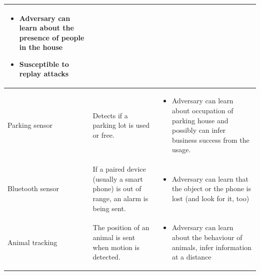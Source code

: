 \begin{longtable}[c]{|l|l|l|}
\begin{minipage}[t]{0.40\columnwidth}
\begin{itemize}
\item
  {Adversary can learn about the presence of people in the house}
\item
  {Susceptible to replay attacks}
\end{itemize}
\strut\end{minipage}\tabularnewline
\hline
\begin{minipage}[t]{0.20\columnwidth}\raggedright\strut
{Parking sensor}
\strut\end{minipage} &
\begin{minipage}[t]{0.30\columnwidth}\raggedright\strut
{Detects if a parking lot is used or free.}
\strut\end{minipage} &
\begin{minipage}[t]{0.40\columnwidth}\raggedright\strut
\begin{itemize}
\tightlist
\item
  {Adversary can learn about occupation of parking house and possibly
  can infer business success from the usage.}
\end{itemize}
\strut\end{minipage}\tabularnewline
\hline
\begin{minipage}[t]{0.20\columnwidth}\raggedright\strut
{Bluetooth sensor}
\strut\end{minipage} &
\begin{minipage}[t]{0.30\columnwidth}\raggedright\strut
{If a paired device (usually a smart phone) is out of range, an alarm is
being sent.}
\strut\end{minipage} &
\begin{minipage}[t]{0.40\columnwidth}\raggedright\strut
\begin{itemize}
\tightlist
\item
  {Adversary can learn that the object or the phone is lost (and look
  for it, too)}
\end{itemize}
\strut\end{minipage}\tabularnewline
\hline
\begin{minipage}[t]{0.20\columnwidth}\raggedright\strut
{Animal tracking}
\strut\end{minipage} &
\begin{minipage}[t]{0.30\columnwidth}\raggedright\strut
{The position of an animal is sent when motion is detected.}
\strut\end{minipage} &
\begin{minipage}[t]{0.40\columnwidth}\raggedright\strut
\begin{itemize}
\tightlist
\item
  {Adversary can learn about the behaviour of animals, infer information
  at a distance}
\end{itemize}
\strut\end{minipage}\tabularnewline
\hline
\end{longtable}

